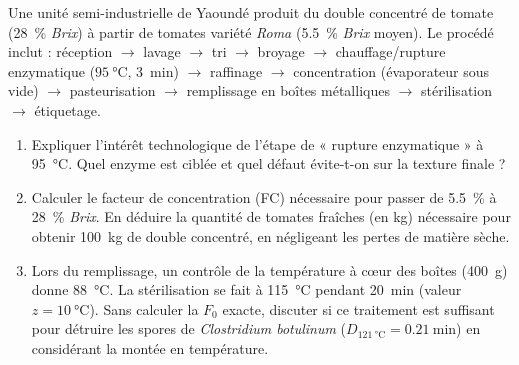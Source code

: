 \documentclass[11pt]{article}
\begin{document}
\begin{exercice}
Une unité semi-industrielle de Yaoundé produit du double concentré de tomate (\SI{28}{\%} \textit{Brix}) à partir de tomates variété \textit{Roma} (\SI{5.5}{\%} \textit{Brix} moyen). Le procédé inclut : réception $\rightarrow$ lavage $\rightarrow$ tri $\rightarrow$ broyage $\rightarrow$ chauffage/rupture enzymatique ($\SI{95}{\celsius}$, \SI{3}{\minute}) $\rightarrow$ raffinage $\rightarrow$ concentration (évaporateur sous vide) $\rightarrow$ pasteurisation $\rightarrow$ remplissage en boîtes métalliques $\rightarrow$ stérilisation $\rightarrow$ étiquetage.
\begin{enumerate}
    \item Expliquer l'intérêt technologique de l'étape de « rupture enzymatique » à \SI{95}{\celsius}. Quel enzyme est ciblée et quel défaut évite-t-on sur la texture finale ?
    \item Calculer le facteur de concentration (FC) nécessaire pour passer de \SI{5.5}{\%} à \SI{28}{\%} \textit{Brix}. En déduire la quantité de tomates fraîches (en kg) nécessaire pour obtenir \SI{100}{kg} de double concentré, en négligeant les pertes de matière sèche.
    \item Lors du remplissage, un contrôle de la température à cœur des boîtes (\SI{400}{g}) donne \SI{88}{\celsius}. La stérilisation se fait à \SI{115}{\celsius} pendant \SI{20}{\minute} (valeur $z = \SI{10}{\celsius}$). Sans calculer la $F_0$ exacte, discuter si ce traitement est suffisant pour détruire les spores de \textit{Clostridium botulinum} ($D_{\SI{121}{\celsius}} = \SI{0.21}{\minute}$) en considérant la montée en température.
\end{enumerate}
\end{exercice}
\end{document}
